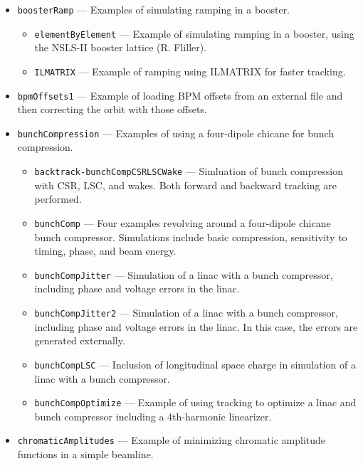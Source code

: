 \begin{itemize}
\item \verb|boosterRamp| --- 
Examples of simulating ramping in a booster.

\begin{itemize}
\item \verb|elementByElement| --- 
 Example of simulating ramping in a booster, using the NSLS-II booster lattice (R. Fliller). 

\item \verb|ILMATRIX| --- 
Example of ramping using ILMATRIX for faster tracking.

\end{itemize}
\item \verb|bpmOffsets1| --- 
 Example of loading BPM offsets from an external file and then correcting the orbit with those offsets. 

\item \verb|bunchCompression| --- 
Examples of using a four-dipole chicane for bunch compression.

\begin{itemize}
\item \verb|backtrack-bunchCompCSRLSCWake| --- 
Simluation of bunch compression with CSR, LSC, and wakes. Both forward and backward tracking are performed.


\item \verb|bunchComp| --- 
 Four examples revolving around a four-dipole chicane bunch compressor. Simulations include basic compression, sensitivity to timing, phase, and beam energy. 

\item \verb|bunchCompJitter| --- 
 Simulation of a linac with a bunch compressor, including phase and voltage errors in the linac. 

\item \verb|bunchCompJitter2| --- 
 Simulation of a linac with a bunch compressor, including phase and voltage errors in the linac. In this case, the errors are generated externally. 

\item \verb|bunchCompLSC| --- 
 Inclusion of longitudinal space charge in simulation of a linac with a bunch compressor. 

\item \verb|bunchCompOptimize| --- 
 Example of using tracking to optimize a linac and bunch compressor including a 4th-harmonic linearizer. 

\end{itemize}
\item \verb|chromaticAmplitudes| --- 
Example of minimizing chromatic amplitude functions in a simple beamline.


\end{itemize}
